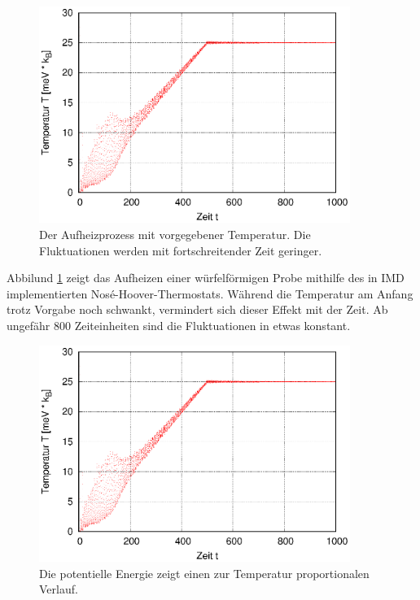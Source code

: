 		\begin{figure}[!ht]
			\centering
			\includegraphics[width=0.9\textwidth,page=1]{chapter/main/single/plt/equilibration/thermostat.eps}
			\caption{Der Aufheizprozess mit vorgegebener Temperatur. Die Fluktuationen werden
			mit fortschreitender Zeit geringer.}
			\label{fig:thermostat}
		\end{figure}

		Abbilund \ref{fig:thermostat} zeigt das Aufheizen einer würfelförmigen Probe mithilfe des
		in IMD implementierten Nosé-Hoover-Thermostats. Während die Temperatur am Anfang trotz
		Vorgabe noch schwankt, vermindert sich dieser Effekt mit der Zeit. Ab ungefähr 800
		Zeiteinheiten sind die Fluktuationen in etwas konstant.

		\begin{figure}[!ht]
			\centering
			\includegraphics[width=0.9\textwidth,page=2]{chapter/main/single/plt/equilibration/thermostat.eps}
			\caption{Die potentielle Energie zeigt einen zur Temperatur proportionalen Verlauf.}
			\label{fig:thermostat_pot}
		\end{figure}

